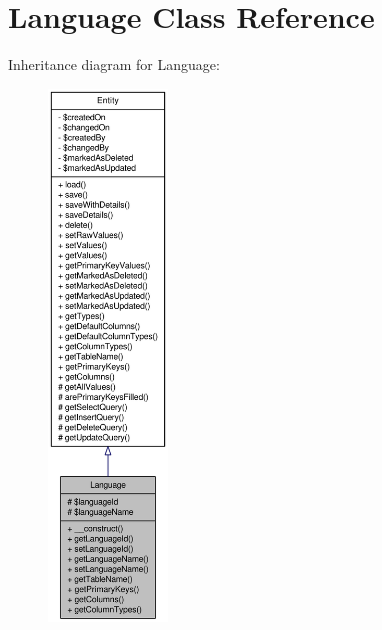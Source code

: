 \hypertarget{classLanguage}{
\section{Language Class Reference}
\label{classLanguage}
}


Inheritance diagram for Language:\nopagebreak
\begin{figure}[H]
\begin{center}
\leavevmode
\includegraphics[height=400pt]{classLanguage__inherit__graph}
\end{center}
\end{figure}


